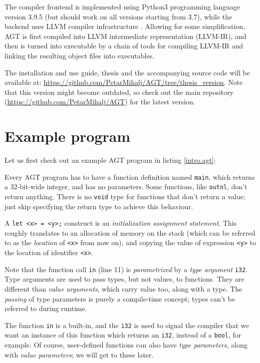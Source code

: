 \documentclass[times, utf8, diplomski]{fer}
\theoremstyle{definition}
\newcommand{\agtcode}[3]{
    
}
\begin{document}
The compiler frontend is implemented using Python3 programming language version 3.9.5 (but should work
on all versions starting from 3.7),
while the backend uses LLVM compiler infrastructure \citep{c_llvm_lattner}.
Allowing for some simplification, AGT is first compiled into LLVM intermediate representation (LLVM-IR),
and then is turned into executable by a chain of tools for compiling LLVM-IR and 
linking the resulting object files into executables.

The installation and use guide, thesis and the accompanying source code will be available at:
\url{https://github.com/PetarMihalj/AGT/tree/thesis_version}. Note that this version
might become outdated, so check out the main repository (\url{https://github.com/PetarMihalj/AGT})
for the latest version.

\section{Example program}

Let us first check out an example AGT program in listing \ref{intro.agt}:

\agtcode{\resdir/programs/intro.agt}{intro.agt}{Example AGT program}

Every AGT program has to have a function definition named \texttt{main}, 
which returns a 32-bit-wide integer,
and has no parameters.
Some functions, like \texttt{outnl}, don't return anything. 
There is no \texttt{void} type for functions that don't return a value;
just skip specifying the return type to achieve this behaviour.

A \texttt{let <x> = <y>;} construct is an \textit{initialization assignment statement}.
This roughly translates to an allocation of memory on the stack (which can be referred
to as the \textit{location} of \texttt{<x>} from now on), and copying the value of expression \texttt{<y>}
to the location of identifier \texttt{<x>}.

Note that the function call \texttt{in} (line 11) is \textit{parametrized} 
by a \textit{type argument} \texttt{i32}.
Type arguments are used to pass types, but not values, to functions. 
They are different than \textit{value arguments}, which carry value too, along with a type.
The \textit{passing} of type parameters is purely a compile-time concept;
types can't be referred to during runtime.


The function \texttt{in} is a built-in, and the \texttt{i32} is used to signal the compiler
that we want an instance of this function which returns an \texttt{i32}, 
instead of a \texttt{bool}, for example. 
Of course, user-defined functions can also have \textit{type parameters}, along with \textit{value parameters};
we will get to these later.
\end{document}
